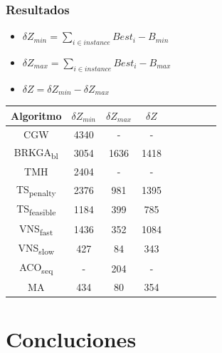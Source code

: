 \documentclass{beamer}
\begin{document}

\begin{frame}
\frametitle{Resultados}

\begin{itemize}
    \item $\delta Z_{min} = \sum_{i \in instance} Best_i - B_{min}$
    \pause
    \item $\delta Z_{max} = \sum_{i \in instance} Best_i - B_{max}$
    \pause
    \item $\delta Z = \delta Z_{min} - \delta Z_{max}$
    \pause
\end{itemize}

\begin{table}
\begin{center}
\begin{tabular}{ |c|c|c|c|c|c|c|c|c| } 
\hline
Algoritmo & $\delta Z_{min}$ & $\delta Z_{max}$ & $\delta Z$  \\
\hline
CGW & 4340 & - & -  \\
BRKGA\textsubscript{bl} & 3054 & 1636 & 1418  \\
TMH & 2404 & - & -  \\
TS\textsubscript{penalty} & 2376 & 981 & 1395  \\
TS\textsubscript{feasible} & 1184 & 399 & 785  \\
VNS\textsubscript{fast} & 1436 & 352 & 1084  \\
VNS\textsubscript{slow} & 427 & 84 & 343  \\
ACO\textsubscript{seq} & - & 204 & -  \\
MA & 434 & 80 & 354  \\
\hline
\end{tabular}
\end{center}
\label{tab:resultadosSintesis}
\end{table}

\end{frame}


\section{Concluciones}
\end{document}
